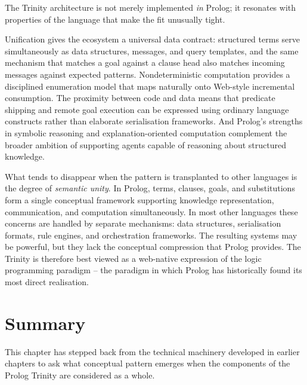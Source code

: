 The Trinity architecture is not merely implemented \emph{in} Prolog; it
resonates with properties of the language that make the fit unusually
tight.

Unification gives the ecosystem a universal data contract: structured
terms serve simultaneously as data structures, messages, and query
templates, and the same mechanism that matches a goal against a clause
head also matches incoming messages against expected patterns.
Nondeterministic computation provides a disciplined enumeration model
that maps naturally onto Web-style incremental consumption. The
proximity between code and data means that predicate shipping and remote
goal execution can be expressed using ordinary language constructs rather
than elaborate serialisation frameworks. And Prolog's strengths in
symbolic reasoning and explanation-oriented computation complement the
broader ambition of supporting agents capable of reasoning about
structured knowledge.

What tends to disappear when the pattern is transplanted to other
languages is the degree of \emph{semantic unity}. In Prolog, terms,
clauses, goals, and substitutions form a single conceptual framework
supporting knowledge representation, communication, and computation
simultaneously. In most other languages these concerns are handled by
separate mechanisms: data structures, serialisation formats, rule
engines, and orchestration frameworks. The resulting systems may be
powerful, but they lack the conceptual compression that Prolog provides.
The Trinity is therefore best viewed as a web-native expression of the
logic programming paradigm -- the paradigm in which Prolog has
historically found its most direct realisation.


\section{Summary}\label{sec:paradigm-summary}

This chapter has stepped back from the technical machinery developed in
earlier chapters to ask what conceptual pattern emerges when the
components of the Prolog Trinity are considered as a whole.

